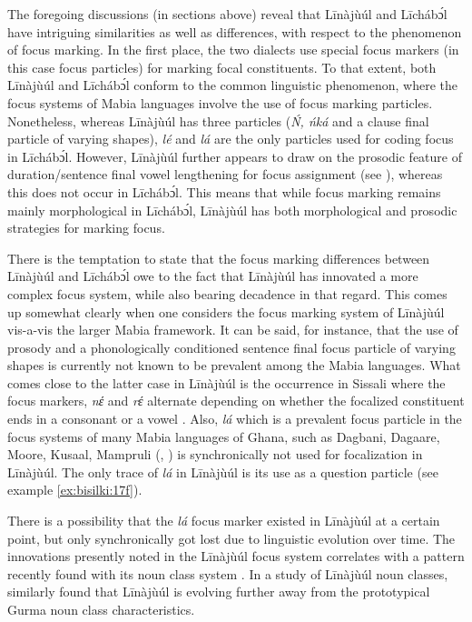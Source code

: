 \documentclass[output=paper,colorlinks,citecolor=brown]{langscibook}
\begin{document}
The foregoing discussions (in sections above) reveal that Līnàjùúl and Līcháb\'{ɔ}l have intriguing similarities as well as differences, with respect to the phenomenon of focus marking. In the first place, the two dialects use special focus markers (in this case focus particles) for marking focal constituents. To that extent, both Līnàjùúl and Līcháb\'{ɔ}l conform to the common linguistic phenomenon, where the focus systems of Mabia languages involve the use of focus marking particles. Nonetheless, whereas Līnàjùúl has three particles (\textit{Ń, ńká} and a clause final particle of varying shapes), \textit{lé} and \textit{lá} are the only particles used for coding focus in Līcháb\'{ɔ}l. However, Līnàjùúl further appears to draw on the prosodic feature of duration/sentence final vowel lengthening for focus assignment (see ), whereas this does not occur in Līcháb\'{ɔ}l. This means that while focus marking remains mainly morphological in Līcháb\'{ɔ}l, Līnàjùúl has both morphological and prosodic strategies for marking focus.

There is the temptation to state that the focus marking differences between Līnàjùúl and Līcháb\'{ɔ}l owe to the fact that Līnàjùúl has innovated a more complex focus system, while also bearing decadence in that regard. This comes up somewhat clearly when one considers the focus marking system of Līnàjùúl vis-a-vis the larger Mabia framework. It can be said, for instance, that the use of prosody and a phonologically conditioned sentence final focus particle of varying shapes is currently not known to be prevalent among the Mabia languages. What comes close to the latter case in Līnàjùúl is the occurrence in Sissali where the focus markers, \textit{nέ} and \textit{rέ} alternate depending on whether the focalized constituent ends in a consonant or a vowel \citep{Dumah2017}. Also, \textit{lá} which is a prevalent focus particle in the focus systems of many Mabia languages of Ghana, such as Dagbani, Dagaare, Moore, Kusaal, Mampruli (\citealt[93]{bodomo1997}, \citealt{Dakubu2003, Issah2013Focus, Saanchi2005}) is synchronically not used for focalization in Līnàjùúl. The only trace of \textit{lá} in Līnàjùúl is its use as a question particle (see example \ref{ex:bisilki:17f}).

There is a possibility that the \textit{lá} focus marker existed in Līnàjùúl at a certain point, but only synchronically got lost due to linguistic evolution over time. The innovations presently noted in the Līnàjùúl focus system correlates with a pattern recently found with its noun class system \citep{BisilkiAkpanglo-Nartey2017}. In a study of Līnàjùúl noun classes, \citet{BisilkiAkpanglo-Nartey2017} similarly found that Līnàjùúl is evolving further away from the prototypical Gurma noun class characteristics.
\end{document}
